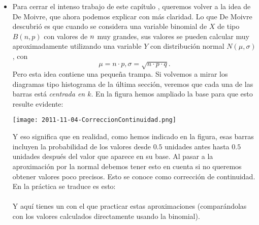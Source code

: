 \begin{itemize}

\item Para cerrar el intenso trabajo de este capítulo , queremos volver a la idea de De Moivre, que ahora podemos explicar con más claridad. Lo que De Moivre descubrió es que cuando se considera una variable binomial de $X$ de tipo $B(n,p)$ con valores de $n\emph{}$ muy grandes, sus valores se pueden calcular muy aproximadamente utilizando una variable $Y$ con distribución normal $N(\mu,\sigma)$, con
    \[\mu=n\cdot p,\sigma=\sqrt{n\cdot p\cdot q}.\]
    Pero esta idea contiene una pequeña trampa. Si volvemos a mirar los diagramas tipo histograma de la última sección, veremos que cada una de las barras está {\em centrada en $k$}. En la figura hemos ampliado la base para que esto resulte evidente:
   \begin{center}
   \texttt{[image: 2011-11-04-CorreccionContinuidad.png]}
   \end{center}
    Y eso significa que en realidad, como hemos indicado en la figura, esas barras incluyen la probabilidad de los valores desde $0.5$ unidades antes hasta $0.5$ unidades después del valor que aparece en su base. Al pasar a la aproximación por la normal debemos tener esto en cuenta si no queremos obtener valores poco precisos. Esto se conoce como {\sf corrección de continuidad}. En la práctica se traduce es esto:\\[3mm]
   \\[3mm]
   Y aquí tienes un  con el que practicar estas aproximaciones (comparándolas con los valores calculados directamente  usando la binomial).



\end{itemize}
